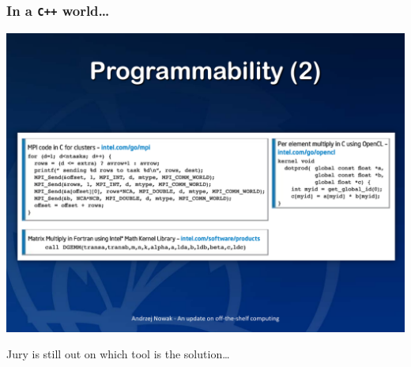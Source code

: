 \documentclass[9pt]{beamer}
\begin{document}
\begin{frame}[fragile]
  \frametitle{In a \verb~C++~ world\ldots{}}
  \begin{center}
    \includegraphics[width=1.\linewidth]{figs/nowak-progs-2.pdf}
  \end{center}

  \begin{block}{}
    \begin{center}
      Jury is still out on which tool is the solution\ldots
    \end{center}
  \end{block}
\end{frame}

\end{document}
